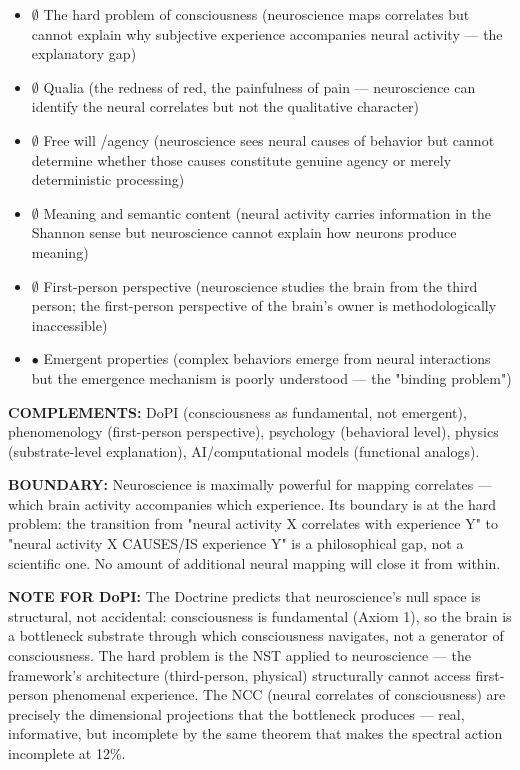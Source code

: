 \begin{itemize}[nosep,leftmargin=*]
  \item $\emptyset$ The hard problem of consciousness (neuroscience maps correlates but cannot explain why subjective experience accompanies neural activity — the explanatory gap)
  \item $\emptyset$ Qualia (the redness of red, the painfulness of pain — neuroscience can identify the neural correlates but not the qualitative character)
  \item $\emptyset$ Free will /\allowbreak  agency (neuroscience sees neural causes of behavior but cannot determine whether those causes constitute genuine agency or merely deterministic processing)
  \item $\emptyset$ Meaning and semantic content (neural activity carries information in the Shannon sense but neuroscience cannot explain how neurons produce meaning)
  \item $\emptyset$ First-person perspective (neuroscience studies the brain from the third person; the first-person perspective of the brain's owner is methodologically inaccessible)
  \item $\bullet$ Emergent properties (complex behaviors emerge from neural interactions but the emergence mechanism is poorly understood — the "binding problem")
\end{itemize}


\textbf{COMPLEMENTS:} DoPI (consciousness as fundamental, not emergent), phenomenology (first-person perspective), psychology (behavioral level), physics (substrate-level explanation), AI/\allowbreak computational models (functional analogs).


\textbf{BOUNDARY:} Neuroscience is maximally powerful for mapping correlates — which brain activity accompanies which experience. Its boundary is at the hard problem: the transition from "neural activity X correlates with experience Y" to "neural activity X CAUSES/\allowbreak IS experience Y" is a philosophical gap, not a scientific one. No amount of additional neural mapping will close it from within.


\textbf{NOTE FOR DoPI:} The Doctrine predicts that neuroscience's null space is structural, not accidental: consciousness is fundamental (Axiom 1), so the brain is a bottleneck substrate through which consciousness navigates, not a generator of consciousness. The hard problem is the NST applied to neuroscience — the framework's architecture (third-person, physical) structurally cannot access first-person phenomenal experience. The NCC (neural correlates of consciousness) are precisely the dimensional projections that the bottleneck produces — real, informative, but incomplete by the same theorem that makes the spectral action incomplete at 12\%.


